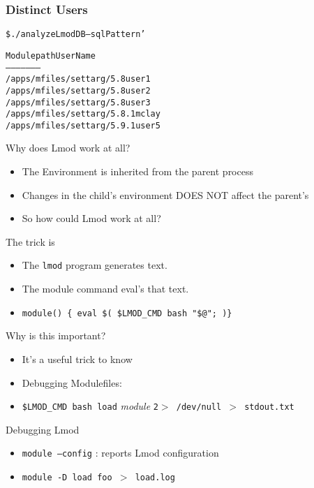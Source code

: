 \documentclass[dvipsnames,aspectratio=169]{beamer}
\begin{document}
\begin{frame}[fragile]
    \frametitle{Distinct Users}
  {\small
    \begin{alltt}
\$ ./analyzeLmodDB --sqlPattern '%/settarg/%' usernames

Module path                   User Name
-----------                   ---------
/apps/mfiles/settarg/5.8      user1
/apps/mfiles/settarg/5.8      user2
/apps/mfiles/settarg/5.8      user3
/apps/mfiles/settarg/5.8.1    mclay
/apps/mfiles/settarg/5.9.1    user5
    \end{alltt}
}
\end{frame}

\begin{frame}{Why does Lmod work at all?}
  \begin{itemize}
    \item The Environment is inherited from the parent process
    \item Changes in the child's environment DOES NOT affect the parent's
    \item So how could Lmod work at all? 
  \end{itemize}
\end{frame}

\begin{frame}{The trick is}
  \begin{itemize}
    \item The \texttt{lmod} program generates text.
    \item The module command eval's that text.
    \item \texttt{module() \{ eval \$( \$LMOD_CMD bash "\$@"; )\}}
  \end{itemize}
\end{frame}

\begin{frame}{Why is this important?}
  \begin{itemize}
    \item It's a useful trick to know
    \item Debugging Modulefiles:
    \item \texttt{\$LMOD\_CMD bash load} \emph{module} \texttt{2$>$
        /dev/null $>$ stdout.txt}
  \end{itemize}
\end{frame}

\begin{frame}{Debugging Lmod}
  \begin{itemize}
    \item \texttt{module --config} : reports Lmod configuration
    \item \texttt{module -D load foo $>$ load.log}
  \end{itemize}
\end{frame}
\end{document}

